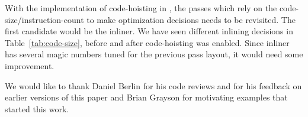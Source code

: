 \documentclass[acmlarge,review]{acmart}\settopmatter{printfolios=true}
\begin{document}
With the implementation of code-hoisting in \LLVM{}, the passes which rely on the
code-size/instruction-count to make optimization decisions needs to be
revisited. The first candidate would be the inliner. We have seen different
inlining decisions in Table~\ref{tab:code-size}, before and after
code-hoisting was enabled.  Since inliner has several magic numbers tuned for
the previous pass layout, it would need some improvement.

\begin{acks}                            %
We would like to thank Daniel Berlin for his code reviews and for his feedback
on earlier versions of this paper and Brian Grayson for motivating examples that
started this work.
\end{acks}




\end{document}
